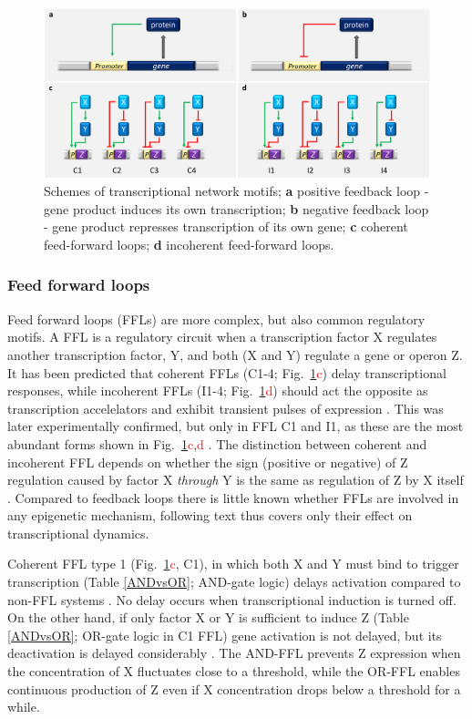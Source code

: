 \begin{figure}[ht!]
  \centering
  \includegraphics[scale=0.29]{text/Pictures/TxnMotifs.png}
    \caption{Schemes of transcriptional network motifs; \textbf{a} positive feedback loop - gene product induces its own transcription; \textbf{b} negative feedback loop - gene product represses transcription of its own gene; \textbf{c} coherent feed-forward loops; \textbf{d} incoherent feed-forward loops.}
    \label{motifs}
\end{figure}

\subsubsection{Feed forward loops}
Feed forward loops (FFLs) are more complex, but also common regulatory motifs.
A FFL is a regulatory circuit when a transcription factor X regulates another transcription factor, Y, and both (X and Y) regulate a gene or operon Z.
It has been predicted that coherent FFLs  (C1-4; Fig.~\ref{motifs}\textcolor{red}{c}) delay transcriptional responses, while incoherent FFLs  (I1-4; Fig.~\ref{motifs}\textcolor{red}{d}) should act the opposite as transcription accelelators and exhibit transient pulses of expression \cite{mangan2003structure}.
This was later experimentally confirmed, but only in FFL C1 and I1, as these are the most abundant forms shown in Fig.~\ref{motifs}\textcolor{red}{c},\textcolor{red}{d} \cite{mangan2003coherent, kalir2005coherent, mangan2006incoherent}.
The distinction between coherent and incoherent FFL depends on whether the sign (positive or negative) of Z regulation caused by factor X \textit{through} Y is the same as regulation of Z by X itself \cite{shen2002network, mangan2003structure}.
Compared to feedback loops there is little known whether FFLs are involved in any epigenetic mechanism, following text thus covers only their effect on transcriptional dynamics.

Coherent FFL type 1 (Fig.~\ref{motifs}\textcolor{red}{c}, C1), in which both X and Y must bind to trigger transcription (Table \ref{ANDvsOR}; AND-gate logic) delays activation compared to non-FFL systems \cite{mangan2003coherent}.
No delay occurs when transcriptional induction is turned off.
On the other hand, if only factor X or Y is sufficient to induce Z (Table \ref{ANDvsOR}; OR-gate logic in C1 FFL) gene activation is not delayed, but its deactivation is delayed considerably \cite{kalir2005coherent}.
The AND-FFL prevents Z expression when the concentration of X fluctuates close to a threshold, while the OR-FFL enables continuous production of Z even if X concentration drops below a threshold for a while.

